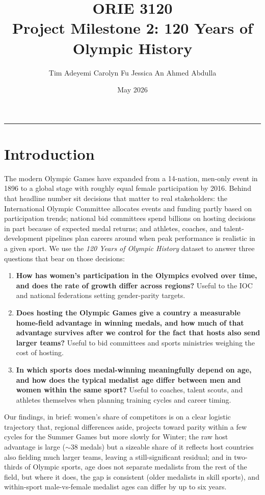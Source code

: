 \documentclass[11pt]{article}
\title{\vspace{-1.2cm}\textbf{ORIE 3120}\\[0.2em]\large Project Milestone 2: 120 Years of Olympic History}
\author{Tim Adeyemi \quad\textbullet\quad Carolyn Fu \quad\textbullet\quad Jessica An \quad\textbullet\quad Ahmed Abdulla}
\date{May 2026}
\begin{document}
\maketitle
\vspace{-1.2em}
\hrule
\vspace{0.6em}

\section*{Introduction}

The modern Olympic Games have expanded from a 14-nation, men-only event in 1896 to a global stage with roughly equal female participation by 2016. Behind that headline number sit decisions that matter to real stakeholders: the International Olympic Committee allocates events and funding partly based on participation trends; national bid committees spend billions on hosting decisions in part because of expected medal returns; and athletes, coaches, and talent-development pipelines plan careers around when peak performance is realistic in a given sport. We use the \textit{120 Years of Olympic History} dataset to answer three questions that bear on those decisions:

\begin{enumerate}[leftmargin=1.4em,itemsep=0.15em,topsep=0.2em]
    \item \textbf{How has women's participation in the Olympics evolved over time, and does the rate of growth differ across regions?} Useful to the IOC and national federations setting gender-parity targets.
    \item \textbf{Does hosting the Olympic Games give a country a measurable home-field advantage in winning medals, and how much of that advantage survives after we control for the fact that hosts also send larger teams?} Useful to bid committees and sports ministries weighing the cost of hosting.
    \item \textbf{In which sports does medal-winning meaningfully depend on age, and how does the typical medalist age differ between men and women within the same sport?} Useful to coaches, talent scouts, and athletes themselves when planning training cycles and career timing.
\end{enumerate}

Our findings, in brief: women's share of competitors is on a clear logistic trajectory that, regional differences aside, projects toward parity within a few cycles for the Summer Games but more slowly for Winter; the raw host advantage is large ($\sim$38 medals) but a sizeable share of it reflects host countries also fielding much larger teams, leaving a still-significant residual; and in two-thirds of Olympic sports, age does not separate medalists from the rest of the field, but where it does, the gap is consistent (older medalists in skill sports), and within-sport male-vs-female medalist ages can differ by up to six years.
\end{document}
